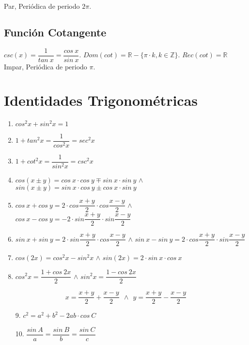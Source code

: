 \documentclass[11pt,a4paper]{article}
\begin{document}
Par, Peri\'odica de periodo $2\pi$.

\subsection{Funci\'on Cotangente}
$csc(x) = \dfrac{1}{tan\ x} = \dfrac{cos\ x}{sin\ x}$. $Dom(cot) = \mathbb{R} - \{\pi \cdot k, k\in \mathbb{Z}\}$. $Rec(cot) = \mathbb{R}$\\

Impar, Peri\'odica de periodo $\pi$.

\newpage

\section{Identidades Trigonom\'etricas}
\begin{enumerate}
\item $cos^2x + sin^2x = 1$
\item $1 + tan^2x = \dfrac{1}{cos^2x} = sec^2x$
\item $1+cot^2x = \dfrac{1}{sin^2x} = csc^2x$
\item $cos(x \pm y) = cos\ x \cdot cos\ y \mp sin\ x \cdot sin\ y$ $\land$ $sin(x \pm y) = sin\ x \cdot cos\ y \pm cos\ x \cdot sin\ y$
\item $cos\ x + cos\ y = 2\cdot cos\dfrac{x+y}{2} \cdot cos\dfrac{x-y}{2}$ $\land$ $cos\ x - cos\ y = -2 \cdot sin\dfrac{x+y}{2} \cdot sin \dfrac{x-y}{2}$
\item $sin\ x + sin\ y = 2\cdot sin \dfrac{x+y}{2} \cdot cos\dfrac{x-y}{2}$ $\land$ $sin\ x - sin\ y = 2 \cdot cos \dfrac{x+y}{2} \cdot sin \dfrac{x-y}{2}$
\item $cos(2x) = cos^2x-sin^2x$ $\land$ $sin(2x)=2\cdot sin\ x \cdot cos\ x$
\item $cos^2x = \dfrac{1+cos\ 2x}{2}$ $\land$ $sin^2x=\dfrac{1-cos\ 2x}{2}$
\end{enumerate}
$$x = \dfrac{x+y}{2} + \dfrac{x-y}{2}\ \ \land \ \ y = \dfrac{x+y}{2}-\dfrac{x-y}{2}$$
\begin{enumerate}
\item[9.] $c^2 = a^2 + b^2 - 2ab\cdot cos\ C$
\item[10.] $\dfrac{sin\ A}{a} = \dfrac{sin\ B}{b} = \dfrac{sin\ C}{c}$
\end{enumerate}
\end{document}
